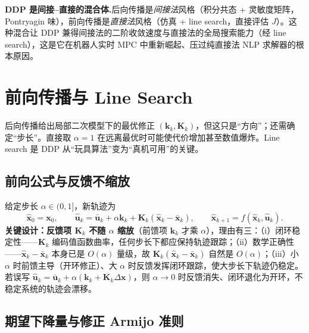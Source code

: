 \begin{insight}
\textbf{DDP 是间接--直接的混合体.}\;后向传播是\emph{间接法}风格（积分共态 + 灵敏度矩阵，Pontryagin 味），前向传播是\emph{直接法}风格（仿真 + line search，直接评估 $J$）。这种混合让 DDP 兼得间接法的二阶收敛速度与直接法的全局搜索能力（经 line search），这是它在机器人实时 MPC 中重新崛起、压过纯直接法 NLP 求解器的根本原因。
\end{insight}

\section{前向传播与 Line Search}
\label{sec:ddp-forward}

后向传播给出局部二次模型下的最优修正 $(\mathbf{k}_k,\mathbf{K}_k)$，但这只是“方向”；还需确定“步长”。直接取 $\alpha=1$ 在远离最优时可能使代价增加甚至数值爆炸。Line search 是 DDP 从“玩具算法”变为“真机可用”的关键。

\subsection{前向公式与反馈不缩放}
\label{sec:ddp-forward-formula}

给定步长 $\alpha\in(0,1]$，新轨迹为
\begin{equation}
  \hat{\mathbf{x}}_0=\mathbf{x}_0,\qquad
  \hat{\mathbf{u}}_k=\bar{\mathbf{u}}_k+\alpha\mathbf{k}_k+\mathbf{K}_k(\hat{\mathbf{x}}_k-\bar{\mathbf{x}}_k),\qquad
  \hat{\mathbf{x}}_{k+1}=f(\hat{\mathbf{x}}_k,\hat{\mathbf{u}}_k).
  \label{eq:ddp-forward}
\end{equation}
\textbf{关键设计：反馈项 $\mathbf{K}_k$ 不随 $\alpha$ 缩放}（前馈项 $\mathbf{k}_k$ 才乘 $\alpha$），理由有三：（i）闭环稳定性——$\mathbf{K}_k$ 编码值函数曲率，任何步长下都应保持轨迹跟踪；（ii）数学正确性——$\hat{\mathbf{x}}_k-\bar{\mathbf{x}}_k$ 本身已是 $O(\alpha)$ 量级，故 $\mathbf{K}_k(\hat{\mathbf{x}}_k-\bar{\mathbf{x}}_k)$ 自然是 $O(\alpha)$；（iii）小 $\alpha$ 时前馈主导（开环修正）、大 $\alpha$ 时反馈发挥闭环跟踪，使大步长下轨迹仍稳定。若误写 $\hat{\mathbf{u}}_k=\bar{\mathbf{u}}_k+\alpha(\mathbf{k}_k+\mathbf{K}_k\Delta\mathbf{x})$，则 $\alpha\to0$ 时反馈消失、闭环退化为开环，不稳定系统的轨迹会漂移。

\subsection{期望下降量与修正 Armijo 准则}
\label{sec:ddp-armijo}

